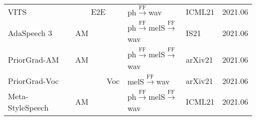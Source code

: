 \documentclass{article}
\begin{document}
\begin{center}
\begin{longtable}{l | l | l | l | l }
		VITS~\cite{kim2021conditional} & ~~~~E2E      &{\color{blue}ph}$\stackrel{\text{FF}}{\longrightarrow}$wav  & ICML21 & 2021.06 \\
		AdaSpeech 3~\cite{yan2021adaspeech3}  & AM       &{\color{blue}ph}$\stackrel{\text{FF}}{\longrightarrow}${\color{red}melS}$\stackrel{\text{FF}}{\longrightarrow}$wav     & IS21 & 2021.06        \\
		PriorGrad-AM~\cite{lee2021priorgrad}            & AM       &{\color{blue}ph}$\stackrel{\text{FF}}{\longrightarrow}${\color{red}melS}$\stackrel{\text{FF}}{\longrightarrow}$wav     &arXiv21  & 2021.06        \\
		PriorGrad-Voc~\cite{lee2021priorgrad}               & ~~~~~~~~Voc      & {\color{red}melS}$\stackrel{\text{FF}}{\longrightarrow}$wav   &arXiv21  & 2021.06         \\
		Meta-StyleSpeech~\cite{min2021meta} & AM       &{\color{blue}ph}$\stackrel{\text{FF}}{\longrightarrow}${\color{red}melS}$\stackrel{\text{FF}}{\longrightarrow}$wav     &ICML21  & 2021.06        \\
		\bottomrule
\end{longtable}
\end{center}





\iffalse
\end{document}
